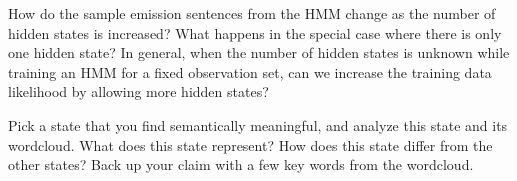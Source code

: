 \indent\problem[5] %
How do the sample emission sentences from the HMM change as the number of hidden states is increased? What happens in the special case where there is only one hidden state? In general, when the number of hidden states is unknown while training an HMM for a fixed observation set, can we increase the training data likelihood by allowing more hidden states?

\begin{subsolution}
	
\end{subsolution}
\newpage


\indent\problem[5] %
Pick a state that you find semantically meaningful, and analyze this state and its wordcloud. What does this state represent? How does this state differ from the other states? Back up your claim with a few key words from the wordcloud.
\begin{subsolution}
	
\end{subsolution}
\newpage



